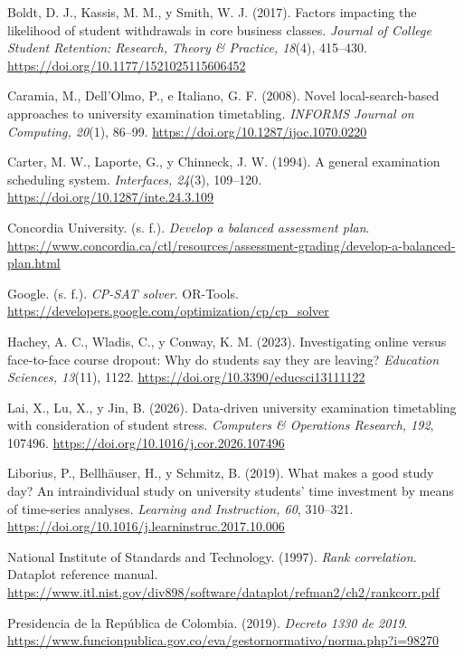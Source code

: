\documentclass[12pt,letterpaper]{article}
\begin{document}
\hangindent=0.5in Boldt, D. J., Kassis, M. M., y Smith, W. J. (2017). Factors impacting the likelihood of student withdrawals in core business classes. \textit{Journal of College Student Retention: Research, Theory \& Practice, 18}(4), 415--430. \url{https://doi.org/10.1177/1521025115606452}

\hangindent=0.5in Caramia, M., Dell'Olmo, P., e Italiano, G. F. (2008). Novel local-search-based approaches to university examination timetabling. \textit{INFORMS Journal on Computing, 20}(1), 86--99. \url{https://doi.org/10.1287/ijoc.1070.0220}

\hangindent=0.5in Carter, M. W., Laporte, G., y Chinneck, J. W. (1994). A general examination scheduling system. \textit{Interfaces, 24}(3), 109--120. \url{https://doi.org/10.1287/inte.24.3.109}

\hangindent=0.5in Concordia University. (s. f.). \textit{Develop a balanced assessment plan}.  \url{https://www.concordia.ca/ctl/resources/assessment-grading/develop-a-balanced-plan.html}

\hangindent=0.5in Google. (s. f.). \textit{CP-SAT solver}. OR-Tools. \url{https://developers.google.com/optimization/cp/cp_solver}

\hangindent=0.5in Hachey, A. C., Wladis, C., y Conway, K. M. (2023). Investigating online versus face-to-face course dropout: Why do students say they are leaving? \textit{Education Sciences, 13}(11), 1122. \url{https://doi.org/10.3390/educsci13111122}

\hangindent=0.5in Lai, X., Lu, X., y Jin, B. (2026). Data-driven university examination timetabling with consideration of student stress. \textit{Computers \& Operations Research, 192}, 107496. \url{https://doi.org/10.1016/j.cor.2026.107496}

\hangindent=0.5in Liborius, P., Bellhäuser, H., y Schmitz, B. (2019). What makes a good study day? An intraindividual study on university students' time investment by means of time-series analyses. \textit{Learning and Instruction, 60}, 310--321. \url{https://doi.org/10.1016/j.learninstruc.2017.10.006}

\hangindent=0.5in National Institute of Standards and Technology. (1997). \textit{Rank correlation}. Dataplot reference manual. \url{https://www.itl.nist.gov/div898/software/dataplot/refman2/ch2/rankcorr.pdf}

\hangindent=0.5in Presidencia de la República de Colombia. (2019). \textit{Decreto 1330 de 2019}.  \url{https://www.funcionpublica.gov.co/eva/gestornormativo/norma.php?i=98270}
\end{document}
